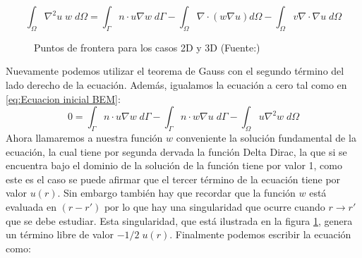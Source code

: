 \documentclass[11pt]{article}
\begin{document}
\begin{equation}
\int_\Omega \nabla^2u\;w\;d\Omega=\int_\Gamma n\cdot u\nabla w\;d\Gamma-\int_\Omega\nabla\cdot(w\nabla u)d\Omega-\int_\Omega v\nabla\cdot\nabla u\;d\Omega
\end{equation}
\begin{figure}[H]

\centering
{}
\caption{Puntos de frontera para los casos 2D y 3D (Fuente:\cite{Brebbia})}\label{fig:Singularidades}
\end{figure}
Nuevamente podemos utilizar el teorema de Gauss con el segundo término del lado derecho de la ecuación. Además, igualamos la ecuación a cero tal como en \eqref{eq:Ecuacion inicial BEM}:
\begin{equation}
0=\int_\Gamma n\cdot u\nabla w\;d\Gamma-\int_\Gamma n\cdot w\nabla u\;d\Gamma-\int_\Omega u \nabla^2 w\;d\Omega
\end{equation}
Ahora llamaremos a nuestra función $w$ conveniente la solución fundamental de la ecuación, la cual tiene por segunda dervada la función Delta Dirac, la que si se encuentra bajo el dominio de la solución de la función tiene por valor 1, como este es el caso se puede afirmar que el tercer término de la ecuación tiene por valor $u(r)$. Sin embargo también hay que recordar que la función $w$ está evaluada en $(r-r')$ por lo que hay una singularidad que ocurre cuando $r\rightarrow r'$ que se debe estudiar. Esta singularidad, que está ilustrada en la figura \ref{fig:Singularidades}, genera un término libre de valor $-1/2\;u(r)$. Finalmente podemos escribir la ecuación como:
\end{document}
